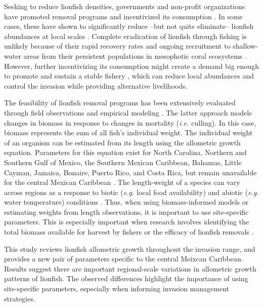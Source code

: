 \documentclass[fleqn,10pt,lineno]{wlpeerj} %
\begin{document}
Seeking to reduce lionfish densities, governments and non-profit
organizations have promoted removal programs and incentivized its
consumption \citep{chin_2016}. In some cases, these have shown to
significantly reduce --but not quite eliminate-- lionfish abundances at
local scales \citep{sandel_2015,chin_2016,deleon_2013}. Complete
eradication of lionfish through fishing is unlikely because of their
rapid recovery rates and ongoing recruitment to shallow-water areas from
their persistent populations in mesophotic coral ecosystems
\citep{barbour_2011,andradibrown_2017}. However, further incentivizing
its consumption might create a demand big enough to promote and sustain
a stable fishery \citep{chin_2016}, which can reduce local abundances
and control the invasion while providing alternative livelihoods.

The feasibility of lionfish removal programs has been extensively
evaluated through field observations
\citep{usseglio_2017,sandel_2015,chin_2016,deleon_2013} and empirical
modeling \citep{barbour_2011,morris_2011,johnston_2015}. The latter
approach models changes in biomass in response to changes in mortality
(\emph{i.e.} culling). In this case, biomass represents the sum of all
fish's individual weight. The individual weight of an organism can be
estimated from its length using the allometric growth equation.
Parameters for this equation exist for North Carolina, Northern and
Southern Gulf of Mexico, the Southern Mexican Caribbean, Bahamas, Little
Cayman, Jamaica, Bonaire, Puerto Rico, and Costa Rica, but remain
unavailable for the central Mexican Caribbean
\citep{barbour_2011,fogg_2013,dahl_2014,aguilarperera_2016,sabidoitza_2016,darling_2011,edwards_2014,chin_2016,deleon_2013,toledohernndez_2014,sandel_2015}.
The length-weight of a species can vary across regions as a response to
biotic (\emph{e.g.} local food availability) and abiotic (\emph{e.g.}
water temperature) conditions \citep{johnson_2016}. Thus, when using
biomass-informed models or estimating weights from length observations,
it is important to use site-specific parameters. This is especially
important when research involves identifying the total biomass available
for harvest by fishers or the efficacy of lionfish removals
\citep{barbour_2011,morris_2011,johnston_2015,chin_2016}.

This study reviews lionfish allometric growth throughout the invasion
range, and provides a new pair of parameters specific to the central
Meixcan Caribbean. Results suggest there are important regional-scale
variations in allometric growth patterns of lionfish. The observed
differences highlight the importance of using site-specific parameters,
especially when informing invasion management strategies.
\end{document}
